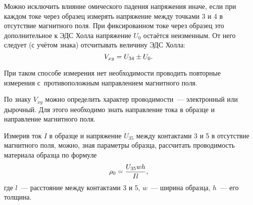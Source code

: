 Можно исключить влияние омического падения напряжения иначе, если при каждом токе через образец измерять напряжение
между точками 3 и 4 в отсутствие магнитного поля. При фиксированном токе через образец это дополнительное к ЭДС Холла напряжение $U_0$ остаётся неизменным. От него следует (с учётом знака) отсчитывать величину ЭДС Холла:
\begin{equation}
	V_{xy} = U_{34}\pm U_0.
	\eqmark{3.4.1}
\end{equation}

При таком способе измерения нет необходимости проводить повторные измерения с~противоположным направлением магнитного поля.

По знаку $V_{xy}$ можно определить характер проводимости~--- электронный или дырочный. Для этого необходимо знать направление тока в образце и направление магнитного поля.

Измерив ток $I$ в образце и напряжение $U_{35}$ между контактами 3 и 5 в отсутствие магнитного поля, можно, зная
параметры образца, рассчитать проводимость материала образца по формуле
\begin{equation}
	\rho_0=\frac{U_{35}wh}{Il},
	\eqmark{3.4.2}
\end{equation}
где $l$~--- расстояние между контактами 3 и 5, $w$~--- ширина образца, $h$~--- его толщина.

